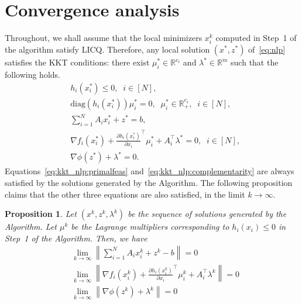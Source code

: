 \documentclass[11pt]{article}
\newtheorem{prop}{Proposition}
\newcommand{\norm}[1]{\left\lVert #1 \right\rVert}
\begin{document}
\section{Convergence analysis}
Throughout, we shall assume that the local minimizers $x_i^k$ computed in Step~1 of the algorithm satisfy LICQ.
Therefore, any local solution $(x^*, z^*)$ of~\eqref{eq:nlp} satisfies the KKT conditions: there exist $\mu_i^* \in \mathbb{R}^{c_i}$ and $\lambda^* \in \mathbb{R}^m$ such that the following holds.
\begin{subequations}\label{eq:kkt_nlp}
    \begin{align}
    & h_i(x_i^*) \leq 0, \;\; i \in [N], \label{eq:kkt_nlp:primalfeas}\\
    & \mathrm{diag}(h_i(x_i^*)) \mu_i^* = 0, \;\;\mu_i^* \in \mathbb{R}^{c_i}_{+}, \;\; i \in [N],\label{eq:kkt_nlp:complementarity} \\
    & \sum_{i = 1}^N A_i x_i^* + z^* = b, \label{eq:kkt_nlp:coupling}\\
    & \nabla f_i(x_i^*) + \frac{\partial h_i(x_i^*)}{\partial x_i}^\top \mu_i^* + A_i^\top \lambda^* = 0, \;\; i \in [N],\label{eq:kkt_nlp:stationarity_x} \\
    & \nabla \phi(z^*) + \lambda^* = 0.\label{eq:kkt_nlp:stationarity_z}
    \end{align}
\end{subequations}
Equations~\eqref{eq:kkt_nlp:primalfeas} and~\eqref{eq:kkt_nlp:complementarity} are always satisfied by the solutions generated by the Algorithm. The following proposition claims that the other three equations are also satisfied, in the limit $k \to \infty$.

\begin{prop}
    Let $(x^k, z^k, \lambda^k)$ be the sequence of solutions generated by the Algorithm. Let $\mu^k$ be the Lagrange multipliers corresponding to $h_i(x_i) \leq 0$ in Step~1 of the Algorithm. Then, we have
    \begin{subequations}\label{eq:kkt_lim}
        \begin{align}
        & \lim_{k \to \infty} \norm{\sum_{i = 1}^N A_i x_i^k + z^k - b} = 0 \label{eq:kkt_lim:coupling}\\
        & \lim_{k \to \infty} \norm{\nabla f_i(x_i^k) + \frac{\partial h_i(x_i^k)}{\partial x_i}^\top \mu_i^k + A_i^\top \lambda^k} = 0\label{eq:kkt_lim:dualfeas_x}\\
        & \lim_{k \to \infty} \norm{\nabla \phi (z^k) + \lambda^k} = 0\label{eq:kkt_lim:dualfeas_z}
        \end{align}
    \end{subequations}
\end{prop}
\end{document}
